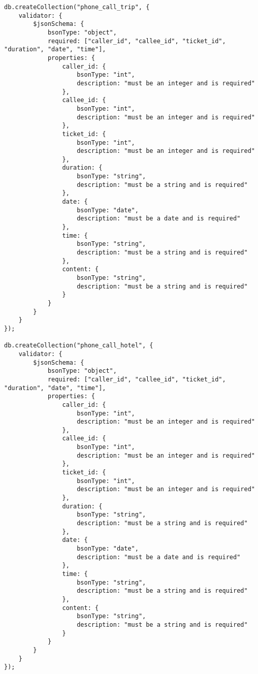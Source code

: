 \begin{lstlisting}
db.createCollection("phone_call_trip", {
	validator: {
		$jsonSchema: {
			bsonType: "object",
			required: ["caller_id", "callee_id", "ticket_id", "duration", "date", "time"],
			properties: {
				caller_id: {
					bsonType: "int",
					description: "must be an integer and is required"
				},
				callee_id: {
					bsonType: "int",
					description: "must be an integer and is required"
				},
				ticket_id: {
					bsonType: "int",
					description: "must be an integer and is required"
				},
				duration: {
					bsonType: "string",
					description: "must be a string and is required"
				},
				date: {
					bsonType: "date",
					description: "must be a date and is required"
				},
				time: {
					bsonType: "string",
					description: "must be a string and is required"
				},
				content: {
					bsonType: "string",
					description: "must be a string and is required"
				}
			}
		}
	}
});

db.createCollection("phone_call_hotel", {
	validator: {
		$jsonSchema: {
			bsonType: "object",
			required: ["caller_id", "callee_id", "ticket_id", "duration", "date", "time"],
			properties: {
				caller_id: {
					bsonType: "int",
					description: "must be an integer and is required"
				},
				callee_id: {
					bsonType: "int",
					description: "must be an integer and is required"
				},
				ticket_id: {
					bsonType: "int",
					description: "must be an integer and is required"
				},
				duration: {
					bsonType: "string",
					description: "must be a string and is required"
				},
				date: {
					bsonType: "date",
					description: "must be a date and is required"
				},
				time: {
					bsonType: "string",
					description: "must be a string and is required"
				},
				content: {
					bsonType: "string",
					description: "must be a string and is required"
				}
			}
		}
	}
});
\end{lstlisting}
\setRTL